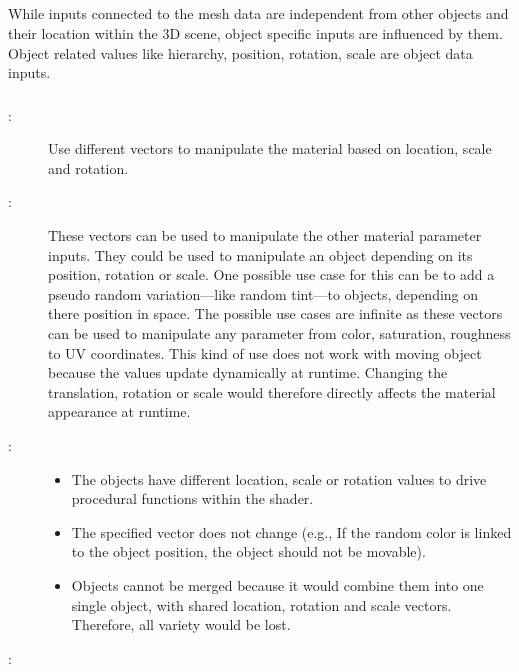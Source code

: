 \subsection{\patCatObjectData}\label{\patCatObjectData}

While inputs connected to the mesh data are independent from other objects and their location within the 3D scene, object specific inputs are influenced by them. Object related values like hierarchy, position, rotation, scale are object data inputs. 

\subsubsection{\patObjectDataVectors}\label{\patObjectDataVectors}
\begin{description}
	\item[\patIntent:]%
	Use different vectors to manipulate the material based on location, scale and rotation. 
	\item[\patMotivation:]%
	These vectors can be used to manipulate the other material parameter inputs. They could be used to manipulate an object depending on its position, rotation or scale. One possible use case for this can be to add a pseudo random variation---like random tint---to objects, depending on there position in space. The possible use cases are infinite as these vectors can be used to manipulate any parameter from color, saturation, roughness to UV coordinates. This kind of use does not work with moving object because the values update dynamically at runtime. Changing the translation, rotation or scale would therefore directly affects the material appearance at runtime.
	\item[\patApplicability:]\hfill 
	\begin{itemize}\mynobreakpar
		\item The objects have different location, scale or rotation values to drive procedural functions within the shader. 
		\item The specified vector does not change (e.g., If the random color is linked to the object position, the object should not be movable).
		\item Objects cannot be merged because it would combine them into one single object, with shared location, rotation and scale vectors. Therefore, all variety would be lost. 
	\end{itemize}
	\item[\patImplementation:]%

\end{description}
